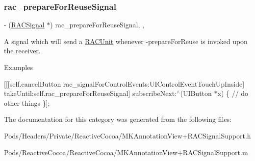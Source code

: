 \subsubsection{\texorpdfstring{rac\+\_\+prepare\+For\+Reuse\+Signal}{rac\_prepareForReuseSignal}}
{\footnotesize\ttfamily -\/ (\mbox{\hyperlink{interface_r_a_c_signal}{R\+A\+C\+Signal}} $\ast$) rac\+\_\+prepare\+For\+Reuse\+Signal\hspace{0.3cm}{\ttfamily [read]}, {\ttfamily [nonatomic]}, {\ttfamily [strong]}}

A signal which will send a \mbox{\hyperlink{interface_r_a_c_unit}{R\+A\+C\+Unit}} whenever -\/prepare\+For\+Reuse is invoked upon the receiver.

Examples

\mbox{[}\mbox{[}\mbox{[}self.\+cancel\+Button rac\+\_\+signal\+For\+Control\+Events\+:U\+I\+Control\+Event\+Touch\+Up\+Inside\mbox{]} take\+Until\+:self.\+rac\+\_\+prepare\+For\+Reuse\+Signal\mbox{]} subscribe\+Next\+:$^\wedge$(U\+I\+Button $\ast$x) \{ // do other things \}\mbox{]}; 

The documentation for this category was generated from the following files\+:\begin{DoxyCompactItemize}
\item 
Pods/\+Headers/\+Private/\+Reactive\+Cocoa/M\+K\+Annotation\+View+\+R\+A\+C\+Signal\+Support.\+h\item 
Pods/\+Reactive\+Cocoa/\+Reactive\+Cocoa/M\+K\+Annotation\+View+\+R\+A\+C\+Signal\+Support.\+m\end{DoxyCompactItemize}
